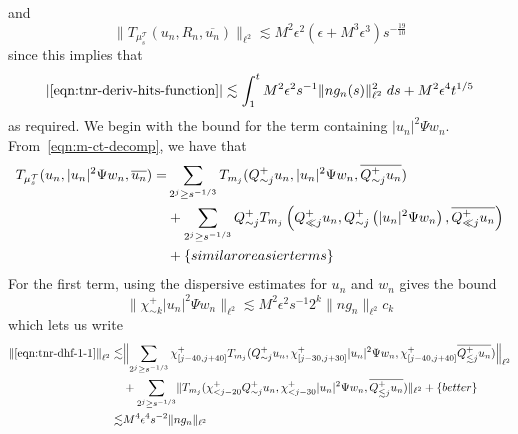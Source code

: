 \documentclass[letterpaper, reqno,final]{amsart}
\newcommand{\cT}{\mathcal{T}}
\newcommand{\discrAvg}{\Psi}
\newcommand{\btext}[1]{\left\{\textup{#1}\right\}}
\newcommand{\bbetter}{\btext{better}}
\newcommand{\bsime}{\btext{similar or easier terms}}
\begin{document}
and
\begin{equation}\label{eqn:tnr-dhf-3-bound}
    \lVert T_{\mu^\cT_s}(u_n, R_n, \overline{u_n})\rVert_{\ell^2} \lesssim M^2 \epsilon^2 (\epsilon + M^3\epsilon^3) s^{-\frac{19}{10}}
\end{equation}
since this implies that
\begin{equation*}
    \left|\eqref{eqn:tnr-deriv-hits-function}\right| \lesssim \int_1^t M^2\epsilon^2 s^{-1} \lVert ng_n(s)\rVert_{\ell^2}^2 \;ds + M^2 \epsilon^4 t^{1/5}
\end{equation*}
as required.  We begin with the bound for the term containing $|u_n|^2 \Psi w_n$.  From~\eqref{eqn:m-ct-decomp}, we have that
\begin{subequations}\begin{align}
    T_{\mu^\cT_s}(u_n, |u_n|^2 \discrAvg w_n, \overline{u_n}) %
    =& \sum_{2^j \geq s^{-1/3}} T_{m_j}(Q^+_{\sim j} u_n, |u_n|^2 \discrAvg w_n, \overline{Q^+_{\sim j} u_n})\label{eqn:tnr-dhf-1-1}\\
    &+ \sum_{2^j \geq s^{-1/3}} Q_{\sim j}^+ T_{m_j}\left(Q^+_{\ll j} u_n, Q_{\sim j}^+\left(|u_n|^2 \discrAvg w_n\right), \overline{Q^+_{\ll j} u_n}\right)\label{eqn:tnr-dhf-1-2}\\
    &+ \bsime\nonumber
\end{align}\end{subequations}
For the first term, using the dispersive estimates for $u_n$ and $w_n$ gives the bound
\begin{equation}\label{eqn:uu-Psi-w-bound}
    \lVert \chi_{\sim k}^+ |u_n|^2 \Psi w_n \rVert_{\ell^2} \lesssim M^2\epsilon^2 s^{-1} 2^k \lVert ng_n \rVert_{\ell^2} c_k
\end{equation}
which lets us write
\begin{equation*}\begin{split}
    \left\lVert \eqref{eqn:tnr-dhf-1-1} \right\rVert_{\ell^2}  \lesssim&\Bigl\lVert \sum_{2^j \geq s^{-1/3}} \chi_{[j-40,j+40]}^+ T_{m_j}( Q_{\sim j}^+ u_n, \chi_{[j-30,j+30]}^+ |u_n|^2 \Psi w_n, \chi_{[j-40,j+40]}^+\overline{Q_{\lesssim j}^+ u_n}) \Bigr\rVert_{\ell^2}\\
    &+\sum_{2^j \geq s^{-1/3}} \lVert T_{m_j}(\chi_{< j - 20}^+ Q_{\sim j}^+ u_n, \chi_{< j - 30}^+ |u_n|^2 \Psi w_n, \overline{Q_{\lesssim j}^+ u_n}) \rVert_{\ell^2}+ \bbetter\\
    \lesssim& M^4\epsilon^4 s^{-2}\lVert ng_n \rVert_{\ell^2}
\end{split}\end{equation*}
\end{document}
